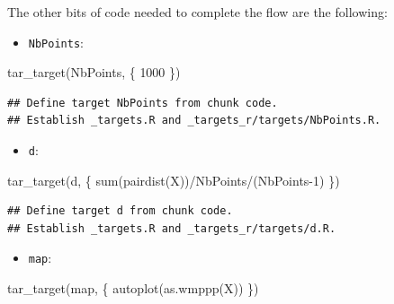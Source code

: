 \documentclass[
  12pt,
  american,
  a4paper,
  extrafontsizes,onecolumn,openright
  ]{memoir}
\newenvironment{Shaded}{\begin{snugshade}}{\end{snugshade}}
\newcommand{\DecValTok}[1]{\textcolor[rgb]{0.00,0.00,0.81}{#1}}
\newcommand{\FunctionTok}[1]{\textcolor[rgb]{0.00,0.00,0.00}{#1}}
\newcommand{\NormalTok}[1]{#1}
\newcommand{\SpecialCharTok}[1]{\textcolor[rgb]{0.00,0.00,0.00}{#1}}
\providecommand{\tightlist}{%
  \setlength{\itemsep}{0pt}\setlength{\parskip}{0pt}}
\begin{document}
The other bits of code needed to complete the flow are the following:

\begin{itemize}
\tightlist
\item
  \texttt{NbPoints}:
\end{itemize}

\scriptsize

\begin{Shaded}
\begin{Highlighting}[]
\FunctionTok{tar\_target}\NormalTok{(NbPoints, \{}
    \DecValTok{1000}
\NormalTok{\})}
\end{Highlighting}
\end{Shaded}

\begin{verbatim}
## Define target NbPoints from chunk code.
## Establish _targets.R and _targets_r/targets/NbPoints.R.
\end{verbatim}

\normalsize

\begin{itemize}
\tightlist
\item
  \texttt{d}:
\end{itemize}

\scriptsize

\begin{Shaded}
\begin{Highlighting}[]
\FunctionTok{tar\_target}\NormalTok{(d, \{}
    \FunctionTok{sum}\NormalTok{(}\FunctionTok{pairdist}\NormalTok{(X))}\SpecialCharTok{/}\NormalTok{NbPoints}\SpecialCharTok{/}\NormalTok{(NbPoints}\DecValTok{{-}1}\NormalTok{)}
\NormalTok{\})}
\end{Highlighting}
\end{Shaded}

\begin{verbatim}
## Define target d from chunk code.
## Establish _targets.R and _targets_r/targets/d.R.
\end{verbatim}

\normalsize

\begin{itemize}
\tightlist
\item
  \texttt{map}:
\end{itemize}

\scriptsize

\begin{Shaded}
\begin{Highlighting}[]
\FunctionTok{tar\_target}\NormalTok{(map, \{}
    \FunctionTok{autoplot}\NormalTok{(}\FunctionTok{as.wmppp}\NormalTok{(X))}
\NormalTok{\})}
\end{Highlighting}
\end{Shaded}
\end{document}
